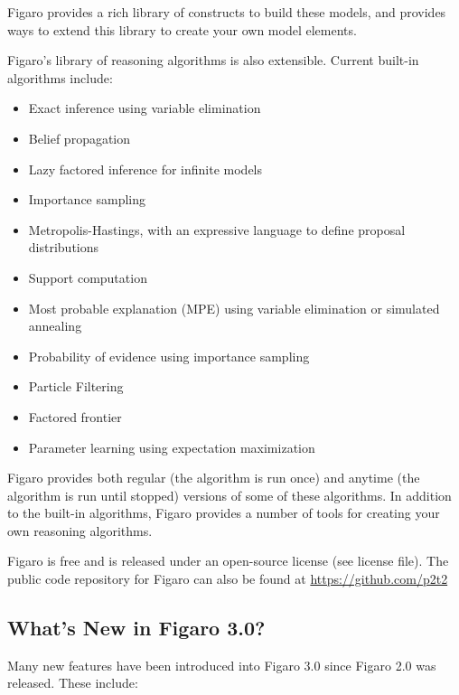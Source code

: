 \documentclass[]{article}
\begin{document}
Figaro provides a rich library of constructs to build these models, and
provides ways to extend this library to create your own model elements.

Figaro's library of reasoning algorithms is also extensible. Current
built-in algorithms include:

\begin{itemize}
\item
  Exact inference using variable elimination
\item
  Belief propagation
\item
  Lazy factored inference for infinite models
\item
  Importance sampling
\item
  Metropolis-Hastings, with an expressive language to define proposal
  distributions
\item
  Support computation
\item
  Most probable explanation (MPE) using variable elimination or
  simulated annealing
\item
  Probability of evidence using importance sampling
\item
  Particle Filtering
\item
  Factored frontier
\item
  Parameter learning using expectation maximization
\end{itemize}

Figaro provides both regular (the algorithm is run once) and anytime
(the algorithm is run until stopped) versions of some of these
algorithms. In addition to the built-in algorithms, Figaro provides a
number of tools for creating your own reasoning algorithms.

Figaro is free and is released under an open-source license (see license
file). The public code repository for Figaro can also be found at
\url{https://github.com/p2t2}

\subsection{What's New in Figaro 3.0?}\label{whats-new-in-figaro-3.0}

Many new features have been introduced into Figaro 3.0 since Figaro 2.0
was released. These include:
\end{document}
